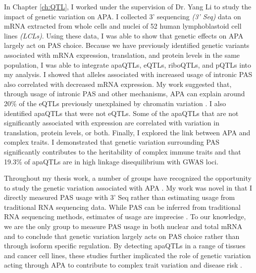 In Chapter \ref{ch:QTL}, I worked under the supervision of Dr. Yang Li to study the impact of genetic variation on APA. I collected 3' sequencing \emph{(3' Seq)} data on mRNA extracted from whole cells and nuclei of 52 human lymphoblastoid cell lines \emph{(LCLs)}. Using these data, I was able to show that genetic effects on APA largely act on PAS choice. Because we have previously identified genetic variants associated with mRNA expression, translation, and protein levels in the same population, I was able to integrate apaQTLs, eQTLs, riboQTLs, and pQTLs into my analysis. I showed that alleles associated with increased usage of intronic PAS also correlated with decreased mRNA expression. My work suggested that, through usage of intronic PAS and other mechanisms, APA can explain around 20\% of the eQTLs previously unexplained by chromatin variation \citep{li_rna_2016}.  I also identified apaQTLs that were not eQTLs. Some of the apaQTLs that are not significantly associated with expression are correlated with variation in translation, protein levels, or both. Finally, I explored the link between APA and complex traits. I demonstrated that genetic variation surrounding PAS significantly contributes to the heritability of complex immune traits and that 19.3\% of apaQTLs are in high linkage disequilibrium with GWAS loci.  

Throughout my thesis work, a number of groups have recognized the opportunity to study the genetic variation associated with APA  \citep{yang_snp2apa_2019, mariella_length_2019, li_genetic_2019}. My work was novel in that I directly measured PAS usage with 3' Seq rather than estimating usage from traditional RNA sequencing data. While PAS can be inferred from traditional RNA sequencing methods, estimates of usage are imprecise \citep{ha_qapa_2018}.  To our knowledge, we are the only group to measure PAS usage in both nuclear and total mRNA and to conclude that genetic variation largely acts on PAS choice rather than through isoform specific regulation. By detecting apaQTLs in a range of tissues and cancer cell lines, these studies further implicated the role of genetic variation acting through APA to contribute to complex trait variation and disease risk \citep{yang_snp2apa_2019, mariella_length_2019, li_genetic_2019}.

